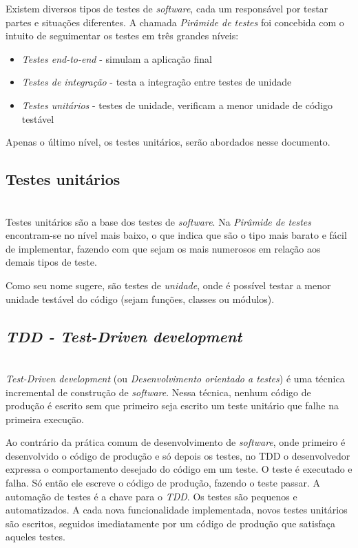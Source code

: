 \documentclass[times, twoside, watermark]{artigo}
\begin{document}
Existem diversos tipos de testes de \textit{software}, cada um responsável por 
testar partes e situações diferentes. A chamada \textit{Pirâmide de testes}
\cite{contan2018test} foi concebida com o intuito de seguimentar os testes em três 
grandes níveis:

\begin{itemize}
\item \textit{Testes end-to-end} - simulam a aplicação final
\item \textit{Testes de integração} - testa a integração entre testes de unidade
\item \textit{Testes unitários} - testes de unidade, verificam a menor unidade de 
código testável
\end{itemize}

Apenas o último nível, os testes unitários, serão abordados nesse documento.

\subsection{Testes unitários}\hfill\\

Testes unitários são a base dos testes de \textit{software}. Na \textit{Pirâmide de 
testes} encontram-se no nível mais baixo, o que indica que são 
o tipo mais barato e fácil de implementar\cite{contan2018test}, 
fazendo com que sejam os mais numerosos em relação aos demais tipos de teste.

Como seu nome sugere, são testes de \textit{unidade}, onde é possível testar a 
menor unidade testável do código (sejam funções, classes ou módulos).

\subsection{\textit{TDD - Test-Driven development}}\hfill\\

\textit{Test-Driven development} (ou \textit{Desenvolvimento orientado a testes}) é 
uma técnica incremental de construção de \textit{software}. 
Nessa técnica, nenhum código de produção é escrito sem que primeiro seja escrito um 
teste unitário que falhe na primeira execução. 

Ao contrário da prática comum de desenvolvimento de \textit{software}, onde primeiro 
é desenvolvido o código de produção e só depois os testes, no TDD
o desenvolvedor expressa o comportamento desejado do código em um teste. 
O teste é executado e falha. Só então ele escreve o código de produção, fazendo o 
teste passar.
A automação de testes é a chave para o \textit{TDD}. Os testes são pequenos e 
automatizados.
A cada nova funcionalidade implementada, novos testes unitários são escritos, 
seguidos imediatamente por um código de produção que satisfaça aqueles testes. 
\end{document}
